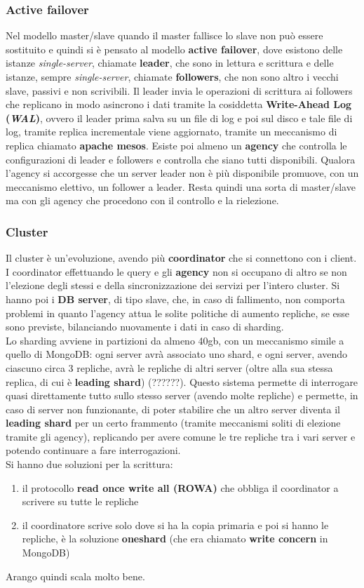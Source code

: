 \documentclass[a4paper,12pt, oneside]{book}
\begin{document}
\subsubsection{Active failover}
Nel modello master/slave quando il master fallisce lo slave non può essere
sostituito e quindi si è pensato al modello \textbf{active failover}, dove
esistono delle istanze \textit{single-server}, chiamate \textbf{leader}, che
sono in lettura e scrittura e delle istanze, sempre \textit{single-server},
chiamate \textbf{followers}, che non sono altro i vecchi slave, passivi e non
scrivibili. Il leader invia le operazioni di scrittura ai followers che
replicano in modo asincrono i dati tramite la cosiddetta \textbf{Write-Ahead Log
  (\textit{WAL})}, ovvero il leader prima salva su un file di log e poi sul
disco e tale file di log, tramite replica incrementale viene aggiornato, tramite
un meccanismo di replica chiamato \textbf{apache mesos}. Esiste poi almeno un
\textbf{agency} che controlla le configurazioni di leader e followers e
controlla che siano tutti disponibili. Qualora l'agency si accorgesse che un
server leader non è più disponibile promuove, con un meccanismo elettivo, un
follower a leader. Resta quindi una sorta di master/slave ma con gli agency che
procedono con il controllo e la rielezione.
\subsubsection{Cluster}
Il cluster è un'evoluzione, avendo più \textbf{coordinator} che si connettono
con i client. I coordinator effettuando le query e gli \textbf{agency} non si
occupano di altro se non l'elezione degli stessi e della sincronizzazione dei
servizi per l'intero cluster. Si hanno poi i \textbf{DB server}, di tipo slave,
che, in caso di fallimento, non comporta problemi in quanto l'agency attua le
solite politiche di aumento repliche, se esse sono previste, bilanciando
nuovamente i dati in caso di sharding.\\
Lo sharding avviene in partizioni da almeno 40gb, con un meccanismo simile a
quello di MongoDB: ogni server avrà associato uno shard, e ogni server, avendo
ciascuno circa 3 repliche, avrà le repliche di altri server (oltre alla sua
stessa replica, di cui è \textbf{leading shard}) (??????). Questo sistema
permette di interrogare quasi 
direttamente tutto sullo stesso server (avendo molte repliche) e permette, in
caso di server non funzionante, di poter stabilire che un altro server diventa
il \textbf{leading shard} per un certo frammento (tramite meccanismi soliti di
elezione tramite gli agency), replicando per avere comune le tre repliche tra i
vari server e potendo continuare a fare interrogazioni.\\
Si hanno due soluzioni per la scrittura:
\begin{enumerate}
  \item il protocollo \textbf{read once write all (ROWA)} che obbliga il
  coordinator a scrivere su tutte le repliche
  \item il coordinatore scrive solo dove si ha la copia primaria e poi si hanno
  le repliche, è la soluzione \textbf{oneshard} (che era chiamato \textbf{write
    concern} in MongoDB)
\end{enumerate}
Arango quindi scala molto bene.
\end{document}
